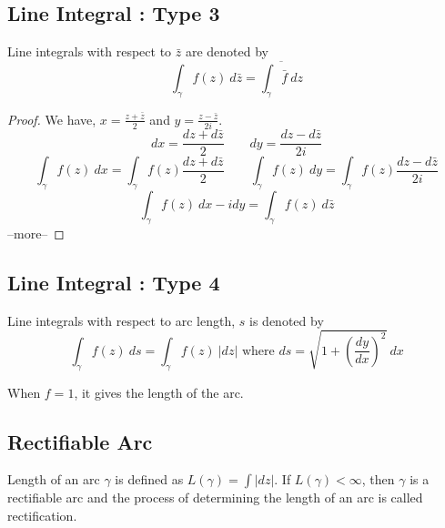\subsection{Line Integral : Type 3}
	Line integrals with respect to $\bar{z}$ are denoted by
\[ \int_\gamma f(z)\ d\bar{z} = \overline{ \int_\gamma \bar{f}\ dz} \]

\begin{proof}
We have,
$x = \frac{z+\bar{z}}{2}$ and $y = \frac{z-\bar{z}}{2i}$. 
\[ dx = \frac{dz+d\bar{z}}{2} \qquad dy = \frac{dz-d\bar{z}}{2i} \]
\[ \int_\gamma f(z)\ dx = \int_\gamma f(z) \frac{dz + d\bar{z}}{2} \qquad \int_\gamma f(z)\ dy = \int_\gamma f(z) \frac{dz-d\bar{z}}{2i} \]
\[ \int_\gamma f(z)\ dx-idy = \int_\gamma f(z)\ d\bar{z} \] --more--
\end{proof}

\subsection{Line Integral : Type 4}
 Line integrals with respect to arc length, $s$ is denoted by 
 \[ \int_\gamma f(z)\ ds  = \int_\gamma f(z)\ |dz| \text{ where } ds = \sqrt{1+\left(\frac{dy}{dx}\right)^2}\ dx \]
 
 	When $f = 1$, it gives the length of the arc.

\subsection{Rectifiable Arc}
	Length of an arc $\gamma$ is defined as $L(\gamma) = \int |dz|$. If $L(\gamma) < \infty$, then $\gamma$ is a rectifiable arc and the process of determining the length of an arc is called rectification.


